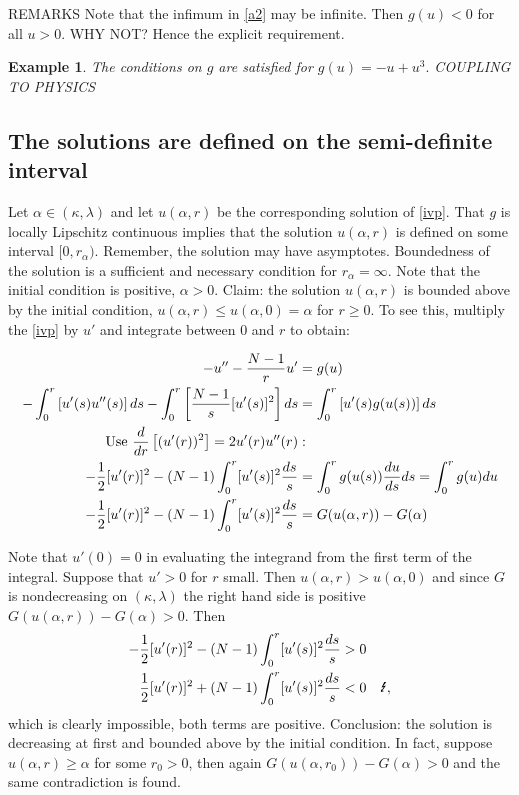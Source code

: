 {\color{red}REMARKS} Note that the infimum in \eqref{a2} may be infinite. Then $g(u)<0$ for all $u>0$. {\color{red}WHY NOT?} Hence the explicit requirement.

\newtheorem{example}{Example}
\begin{example} The conditions on $g$ are satisfied for $g(u)=-u+u^3.$ {\color{red}COUPLING TO PHYSICS}
\end{example}

\subsection{The solutions are defined on the semi-definite interval}\hfill\label{semidef}

Let $\alpha\in(\kappa,\lambda)$ and let $u(\alpha,r)$ be the corresponding solution of \eqref{ivp}. That $g$ is locally Lipschitz continuous implies that the solution $u(\alpha,r)$ is defined on some interval $[0,r_\alpha)$. Remember, the solution may have asymptotes. Boundedness of the solution is a sufficient and necessary condition for $r_\alpha=\infty$. Note that the initial condition is positive, $\alpha>0$. Claim: the solution $u(\alpha,r)$ is bounded above by the initial condition, $u(\alpha,r)\leq u(\alpha,0)=\alpha$ for $r\geq0$. To see this, multiply the \eqref{ivp} by $u'$ and integrate between 0 and $r$ to obtain:

\begin{align}\label{ivpint}
-u''-\frac{N-1}{r}u'&=g(u)\nonumber\\
-\int_0^r\left[u'(s)u''(s)\right]ds-\int_0^r\left[\frac{N-1}{s}[u'(s)]^2\right]ds&=\int_0^r\left[u'(s)g(u(s))\right]ds\nonumber\\
\notag\text{Use }\frac{d}{dr}\left[(u'(r))^2\right]=2u'(r)u''(r)&:\\
-\frac{1}{2}[u'(r)]^2-(N-1)\int_0^r[u'(s)]^2\frac{ds}{s}&=\int_0^r g(u(s))\frac{du}{ds}ds=\int_0^r g(u)du\nonumber\\
-\frac{1}{2}[u'(r)]^2-(N-1)\int_0^r[u'(s)]^2\frac{ds}{s}&=G(u(\alpha,r))-G(\alpha)
\end{align}

Note that $u'(0)=0$ in evaluating the integrand from the first term of the integral. Suppose that $u'>0$ for $r$ small. Then $u(\alpha,r)>u(\alpha,0)$ and since $G$ is nondecreasing on $(\kappa,\lambda)$ the right hand side is positive $G(u(\alpha,r))-G(\alpha)>0$. Then
\begin{align*}
-\frac{1}{2}[u'(r)]^2-(N-1)\int_0^r[u'(s)]^2\frac{ds}{s}&>0\\
\frac{1}{2}[u'(r)]^2+(N-1)\int_0^r[u'(s)]^2\frac{ds}{s}&<0\quad\text{\Lightning},
\end{align*}
which is clearly impossible, both terms are positive. Conclusion: the solution is decreasing at first and bounded above by the initial condition. In fact, suppose $u(\alpha,r)\geq\alpha$ for some $r_0>0$, then again $G(u(\alpha,r_0))-G(\alpha)>0$ and the same contradiction is found. 

